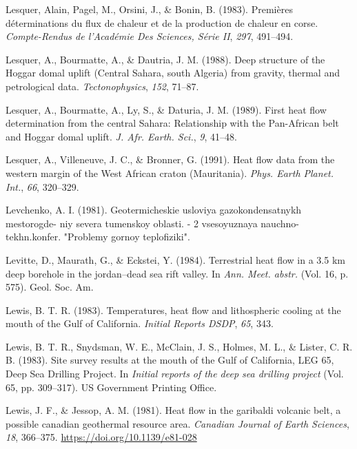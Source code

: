 \documentclass[draft,linenumbers]{agujournal2018}
\begin{document}
\leavevmode{}%
Lesquer, Alain, Pagel, M., Orsini, J., \& Bonin, B. (1983). Premières
déterminations du flux de chaleur et de la production de chaleur en
corse. \emph{Compte-Rendus de l'Académie Des Sciences, Série II},
\emph{297}, 491--494.

\leavevmode{}%
Lesquer, A., Bourmatte, A., \& Dautria, J. M. (1988). Deep structure of
the {Hoggar} domal uplift {(Central Sahara, south Algeria)} from
gravity, thermal and petrological data. \emph{Tectonophysics},
\emph{152}, 71--87.

\leavevmode{}%
Lesquer, A., Bourmatte, A., Ly, S., \& Daturia, J. M. (1989). First heat
flow determination from the central {Sahara}: Relationship with the
{Pan-African} belt and {Hoggar} domal uplift. \emph{J. Afr. Earth.
Sci.}, \emph{9}, 41--48.

\leavevmode{}%
Lesquer, A., Villeneuve, J. C., \& Bronner, G. (1991). Heat flow data
from the western margin of the {West African} craton {(Mauritania)}.
\emph{Phys. Earth Planet. Int.}, \emph{66}, 320--329.

\leavevmode{}%
Levchenko, A. I. (1981). Geotermicheskie usloviya gazokondensatnykh
mestorogde- niy severa tumenskoy oblasti. - 2 vsesoyuznaya
nauchno-tekhn.konfer. "Problemy gornoy teplofiziki".

\leavevmode{}%
Levitte, D., Maurath, G., \& Eckstei, Y. (1984). Terrestrial heat flow
in a 3.5 km deep borehole in the jordan--dead sea rift valley. In
\emph{Ann. Meet. abstr.} (Vol. 16, p. 575). Geol. Soc. Am.

\leavevmode{}%
Lewis, B. T. R. (1983). Temperatures, heat flow and lithospheric cooling
at the mouth of the {Gulf of California}. \emph{Initial Reports DSDP},
\emph{65}, 343.

\leavevmode{}%
Lewis, B. T. R., Snydsman, W. E., McClain, J. S., Holmes, M. L., \&
Lister, C. R. B. (1983). Site survey results at the mouth of the {Gulf
of California, LEG 65, Deep Sea Drilling Project}. In \emph{Initial
reports of the deep sea drilling project} (Vol. 65, pp. 309--317). US
Government Printing Office.

\leavevmode{}%
Lewis, J. F., \& Jessop, A. M. (1981). Heat flow in the garibaldi
volcanic belt, a possible canadian geothermal resource area.
\emph{Canadian Journal of Earth Sciences}, \emph{18}, 366--375.
\url{https://doi.org/10.1139/e81-028}
\end{document}
